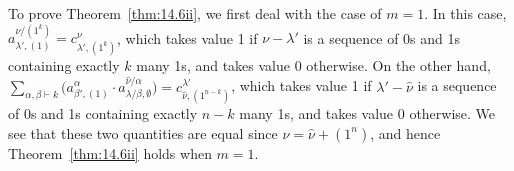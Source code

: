 To prove Theorem~\ref{thm:14.6ii}, we first deal with the case of $m=1$. In this case, $a^{\nu/(1^k)}_{\lambda',(1)} = c^{\nu}_{\lambda',(1^k)}$, which takes value 1 if $\nu-\lambda'$ is a sequence of 0s and 1s containing exactly $k$ many 1s, and takes value 0 otherwise. On the other hand, $\sum_{\alpha,\beta\vdash k} \big(a^\alpha_{\beta',(1)}\cdot a^{\hat{\nu}/\alpha}_{\lambda/\beta,\emptyset}\big)=c^{\lambda'}_{\hat{\nu},(1^{n-k})}$, which takes value 1 if $\lambda'-\hat{\nu}$ is a sequence of 0s and 1s containing exactly $n-k$ many 1s, and takes value 0 otherwise. We see that these two quantities are equal since $\nu=\hat{\nu}+(1^n)$, and hence Theorem~\ref{thm:14.6ii} holds when $m=1$. 
